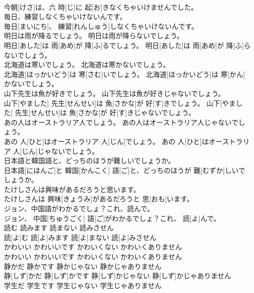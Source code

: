 \documentclass[8pt]{extreport}
\begin{document}
\begin{CJK}{UTF8}{min}
\\	今朝[けさ]は、六 時[じ]に 起[お]きなくちゃいけませんでした。	
\\	毎日、練習しなくちゃいけないんです。	
\\	毎日[まいにち]、 練習[れんしゅう]しなくちゃいけないんです。	
\\	明日は雨が降るでしょう。 明日は雨が降らないでしょう。	
\\	明日[あした]は 雨[あめ]が 降[ふ]るでしょう。 明日[あした]は 雨[あめ]が 降[ふ]らないでしょう。	
\\	北海道は寒いでしょう。 北海道は寒かないでしょう。	
\\	北海道[ほっかいどう]は 寒[さむ]いでしょう。 北海道[ほっかいどう]は 寒[かん]かないでしょう。	
\\	山下先生は魚が好きでしょう。 山下先生は魚が好きじゃないでしょう。	
\\	山下[やました] 先生[せんせい]は 魚[さかな]が 好[す]きでしょう。 山下[やました] 先生[せんせい]は 魚[さかな]が 好[す]きじゃないでしょう。	
\\	あの人はオーストラリア人でしょう。 あの人はオーストラリア人じゃないでしょう。	
\\	あの 人[ひと]はオーストラリア 人[じん]でしょう。 あの 人[ひと]はオーストラリア 人[じん]じゃないでしょう。	
\\	日本語と韓国語と、どっちのほうが難しいでしょうか。	
\\	日本語[にほんご]と 韓国[かんこく] 語[ご]と、どっちのほうが 難[むずか]しいでしょうか。	
\\	たけしさんは興味があるだろうと思います。	
\\	たけしさんは 興味[きょうみ]があるだろうと 思[おも]います。	
\\	ジョン、中国語がわかるでしょ？これ、読んで。	
\\	ジョン、 中国[ちゅうごく] 語[ご]がわかるでしょ？これ、 読[よ]んで。	
\\	読む 読みます 読まない 読みさせん	
\\	読[よ]む 読[よ]みます 読[よ]まない 読[よ]みさせん	
\\	かわいい かわいいです かわいくない かわいくありません	
\\	かわいい かわいいです かわいくない かわいくありません	
\\	静かだ 静かです 静かじゃない 静かじゃありません	
\\	静[しず]かだ 静[しず]かです 静[しず]かじゃない 静[しず]かじゃありません	
\\	学生だ 学生です 学生じゃない 学生じゃありません	

\end{CJK}
\end{document}
